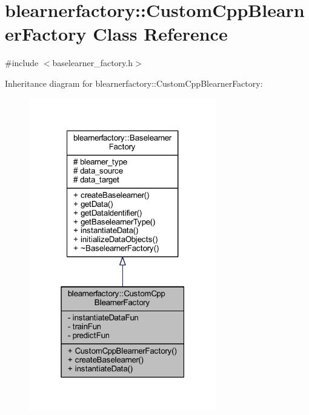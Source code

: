 \hypertarget{classblearnerfactory_1_1_custom_cpp_blearner_factory}{}\section{blearnerfactory\+:\+:Custom\+Cpp\+Blearner\+Factory Class Reference}
\label{classblearnerfactory_1_1_custom_cpp_blearner_factory}


{\ttfamily \#include $<$baselearner\+\_\+factory.\+h$>$}



Inheritance diagram for blearnerfactory\+:\+:Custom\+Cpp\+Blearner\+Factory\+:\nopagebreak
\begin{figure}[H]
\begin{center}
\leavevmode
\includegraphics[width=232pt]{classblearnerfactory_1_1_custom_cpp_blearner_factory__inherit__graph}
\end{center}
\end{figure}


